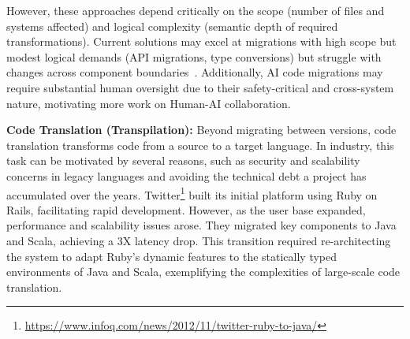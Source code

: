 However, these approaches depend critically on the scope (number of files and systems affected) and logical complexity (semantic depth of required transformations). Current solutions may excel at migrations with high scope but modest logical demands (API migrations, type conversions) but struggle with changes across component boundaries~\citep{nikolov2025google}. Additionally, AI code migrations may require substantial human oversight due to their safety-critical and cross-system nature, motivating more work on Human-AI collaboration.



\textbf{Code Translation (Transpilation):} Beyond migrating between versions, code translation transforms code from a source to a target language. In industry, this task can be motivated by several reasons, such as security and scalability concerns in legacy languages and avoiding the technical debt a project has accumulated over the years.
% 
Twitter\footnote{\url{https://www.infoq.com/news/2012/11/twitter-ruby-to-java/}} built its initial platform using Ruby on Rails, facilitating rapid development. However, as the user base expanded, performance and scalability issues arose. They migrated key components to Java and Scala, achieving a 3X latency drop. This transition required re-architecting the system to adapt Ruby's dynamic features to the statically typed environments of Java and Scala, exemplifying the complexities of large-scale code translation.

